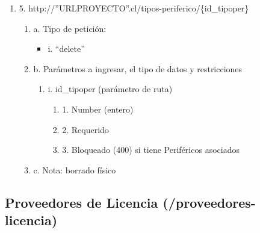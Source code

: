 \begin{enumerate}
    \item 5. http://”URLPROYECTO”.cl/tipos-periferico/\{id\_tipoper\}
    \begin{enumerate}
        \item a. Tipo de petición:
            \begin{itemize}
               \item i. “delete”
            \end{itemize}
        \item b. Parámetros a ingresar, el tipo de datos y restricciones
            \begin{enumerate}
                \item i. id\_tipoper (parámetro de ruta)
                    \begin{enumerate}
                        \item 1. Number (entero)
                        \item 2. Requerido
                        \item 3. Bloqueado (400) si tiene Periféricos asociados
                    \end{enumerate}
            \end{enumerate}
        \item c. Nota: borrado físico
    \end{enumerate}
\end{enumerate}

\subsection{Proveedores de Licencia (/proveedores-licencia)}

